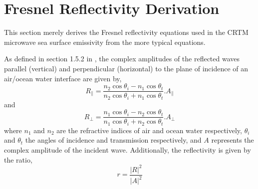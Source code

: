 \section{Fresnel Reflectivity Derivation}
\label{sec:fresnel_equations}
This section merely derives the Fresnel reflectivity equations used in the CRTM microwave sea surface emissivity from the more typical equations.

As defined in section 1.5.2 in \cite{BornWolf1999}, the complex amplitudes of the reflected waves parallel (vertical) and perpendicular (horizontal) to the plane of incidence of an air/ocean water interface are given by,
\begin{equation}
  R_{\parallel} = \frac{n_{2}\cos\theta_{i} - n_{1}\cos\theta_{t}}{n_{2}\cos\theta_{i} + n_{1}\cos\theta_{t}}.A_{\parallel}
  \label{eqn:Rv_amplitude}
\end{equation}
and
\begin{equation}
  R_{\perp} = \frac{n_{1}\cos\theta_{i} - n_{2}\cos\theta_{t}}{n_{1}\cos\theta_{i} + n_{2}\cos\theta_{t}}.A_{\perp}
  \label{eqn:Rh_amplitude}
\end{equation}
where $n_{1}$ and $n_{2}$ are the refractive indices of air and ocean water respectively, $\theta_{i}$ and $\theta_{t}$ the angles of incidence and transmission respectively, and $A$ represents the complex amplitude of the incident wave. Additionally, the reflectivity is given by the ratio,
\begin{equation}
  r = \frac{|R|^{2}}{|A|^{2}}
  \label{eqn:reflectivity}
\end{equation}

